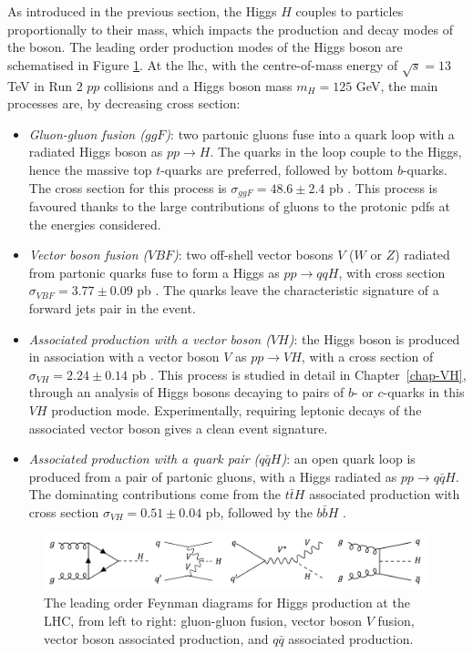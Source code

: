 As introduced in the previous section, the Higgs $H$ couples to particles proportionally to their mass, which impacts the production and decay modes of the boson. The leading order production modes of the Higgs boson are schematised in Figure \ref{fig:prodH}. At the \gls{lhc}, with the centre-of-mass energy of $\sqrt{s} = 13$ TeV in Run 2 $pp$ collisions and a Higgs boson mass $m_H = 125$ GeV, the main processes are, by decreasing cross section: 
\begin{itemize}[leftmargin=*]
    \item \textit{Gluon-gluon fusion ($ggF$)}: two partonic gluons fuse into a quark loop with a radiated Higgs boson as $pp \rightarrow H$. The quarks in the loop couple to the Higgs, hence the massive top $t$-quarks are preferred, followed by bottom $b$-quarks. The cross section for this process is $\sigma_{ggF} = 48.6 \pm 2.4$ pb \cite{LHCHiggsCrossSectionWorkingGroup:2016ypw}. This process is favoured thanks to the large contributions of gluons to the protonic \gls{pdf}s at the energies considered.
    \item \textit{Vector boson fusion ($VBF$)}: two off-shell vector bosons $V$ ($W$ or $Z$) radiated from partonic quarks fuse to form a Higgs as $pp \rightarrow qqH$, with cross section $\sigma_{VBF} = 3.77 \pm 0.09$ pb \cite{LHCHiggsCrossSectionWorkingGroup:2016ypw}. The quarks leave the characteristic signature of a forward jets pair in the event.
    \item \textit{Associated production with a vector boson ($VH$)}: the Higgs boson is produced in association with a vector boson $V$ as $pp \rightarrow VH$, with a cross section of $\sigma_{VH} = 2.24 \pm 0.14$ pb \cite{LHCHiggsCrossSectionWorkingGroup:2016ypw}. This process is studied in detail in Chapter~\ref{chap-VH}, through an analysis of Higgs bosons decaying to pairs of $b$- or $c$-quarks in this $VH$ production mode. Experimentally, requiring leptonic decays of the associated vector boson gives a clean event signature.
    \item \textit{Associated production with a quark pair ($q\bar{q}H$)}: an open quark loop is produced from a pair of partonic gluons, with a Higgs radiated as $pp \rightarrow q\bar{q}H$. The dominating contributions come from the $t\bar{t}H$ associated production with cross section $\sigma_{VH} = 0.51 \pm 0.04$ pb, followed by the $b\bar{b}H$ \cite{LHCHiggsCrossSectionWorkingGroup:2016ypw}.
\end{itemize}

\begin{figure}[h!]
    \center
    \includegraphics[width=\textwidth]{Images/Theory/higgsprod.png}
    \caption{The leading order Feynman diagrams for Higgs production at the LHC, from left to right: gluon-gluon fusion, vector boson $V$ fusion, vector boson associated production, and $q\bar{q}$ associated production.}
    \label{fig:prodH}
\end{figure}

